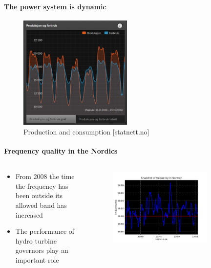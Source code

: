 \begin{frame}{\secname}
	\framesubtitle{The power system is dynamic}
	\begin{figure}
		\includegraphics[width=0.5\textwidth]{./pictures/static}
		\caption{Production and consumption [statnett.no]}
	\end{figure}
\end{frame}
\begin{frame}{\secname}
	\framesubtitle{Frequency quality in the Nordics}
	\begin{columns}
		\begin{column}{0.5\textwidth}
			\begin{itemize}
				\item From 2008 the time the frequency has been outside its allowed band has increased
				\item The performance of hydro turbine governors play an important role
			\end{itemize}
		\end{column}
		\begin{column}{0.5\textwidth}
			\begin{figure}
				\includegraphics[width=0.8\textwidth]{./pictures/frequency.pdf}
			\end{figure}
		\end{column}
	\end{columns}
\end{frame}
